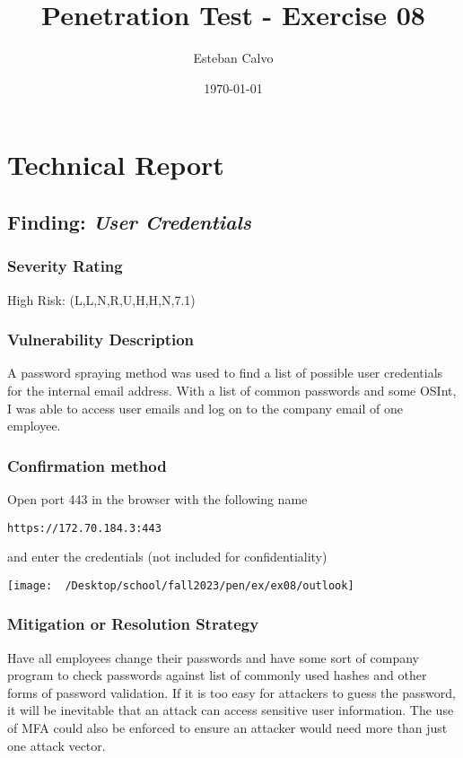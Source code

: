 \documentclass[notitlepage]{article}
\begin{document}
  
\title{Penetration Test - Exercise 08}
\author{Esteban Calvo}
\date{\isodate\today}

\maketitle

\tableofcontents

\newpage

\section{Technical Report}

  \subsection{Finding: \emph{User Credentials}}
  
	\subsubsection*{Severity Rating}
	    High Risk:	    
		\cvss(L,L,N,R,U,H,H,N,7.1)
		
  	\subsubsection*{Vulnerability Description}
  		A password spraying method was used to find a list of possible user credentials for the internal email address. With a list of
        common passwords and some OSInt, I was able to access user emails and log on to the company email of one employee.

  	\subsubsection*{Confirmation method}
  	    Open port 443 in the browser with the following name
\begin{verbatim}
https://172.70.184.3:443
\end{verbatim}

    and enter the credentials (not included for confidentiality)

\texttt{[image: ~/Desktop/school/fall2023/pen/ex/ex08/outlook]}
				
    \subsubsection*{Mitigation or Resolution Strategy}
        Have all employees change their passwords and have some sort of company program to check passwords against list of commonly used hashes and other forms of password validation.
        If it is too easy for attackers to guess the password, it will be inevitable that an attack can access sensitive user information. The use of MFA could also be enforced
        to ensure an attacker would need more than just one attack vector.
\end{document}
